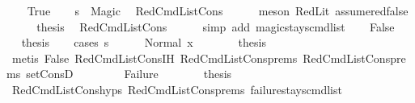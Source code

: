 \begin{isabellebody}
\ \ \isamarkupfalse%
\ True\isanewline
\ \ \isamarkupfalse%
\ {\isachardoublequoteopen}s{\isacharprime}{\kern0pt}{\isacharprime}{\kern0pt}\ {\isacharequal}{\kern0pt}\ Magic{\isachardoublequoteclose}\ \isamarkupfalse%
\ RedCmdListCons\isanewline
\ \ \ \ \isamarkupfalse%
\ {\isacharparenleft}{\kern0pt}meson\ RedLit\ assume{\isacharunderscore}{\kern0pt}red{\isacharunderscore}{\kern0pt}false{\isacharparenright}{\kern0pt}\isanewline
\ \ \isamarkupfalse%
\ \isamarkupfalse%
\ {\isacharquery}{\kern0pt}thesis\ \isamarkupfalse%
\ RedCmdListCons\isanewline
\ \ \ \ \isamarkupfalse%
\ {\isacharparenleft}{\kern0pt}simp\ add{\isacharcolon}{\kern0pt}\ magic{\isacharunderscore}{\kern0pt}stays{\isacharunderscore}{\kern0pt}cmd{\isacharunderscore}{\kern0pt}list{\isacharunderscore}{\kern0pt}{}{\isacharparenright}{\kern0pt}\isanewline
{}\isamarkupfalse%
\isanewline
\ \ \isamarkupfalse%
\ False\isanewline
\ \ \isamarkupfalse%
\ \isamarkupfalse%
\ {\isacharquery}{\kern0pt}thesis\isanewline
\ \ \isamarkupfalse%
\ {\isacharparenleft}{\kern0pt}cases\ {\isachardoublequoteopen}s{\isacharprime}{\kern0pt}{\isacharprime}{\kern0pt}{\isachardoublequoteclose}{\isacharparenright}{\kern0pt}\isanewline
\ \ \ \ \isamarkupfalse%
\ {\isacharparenleft}{\kern0pt}Normal\ x{}{\isacharparenright}{\kern0pt}\isanewline
\ \ \ \ \isamarkupfalse%
\ \isamarkupfalse%
\ {\isacharquery}{\kern0pt}thesis\isanewline
\ \ \ \ \ \ \isamarkupfalse%
\ {\isacharparenleft}{\kern0pt}metis\ False\ RedCmdListCons{\isachardot}{\kern0pt}IH\ RedCmdListCons{\isachardot}{\kern0pt}prems{\isacharparenleft}{\kern0pt}{}{\isacharparenright}{\kern0pt}\ RedCmdListCons{\isachardot}{\kern0pt}prems{\isacharparenleft}{\kern0pt}{}{\isacharparenright}{\kern0pt}\ set{\isacharunderscore}{\kern0pt}ConsD{\isacharparenright}{\kern0pt}\isanewline
\ \ \isamarkupfalse%
\isanewline
\ \ \ \ \isamarkupfalse%
\ Failure\isanewline
\ \ \ \ \isamarkupfalse%
\ \isamarkupfalse%
\ {\isacharquery}{\kern0pt}thesis\isanewline
\ \ \ \ \ \ \isamarkupfalse%
\ RedCmdListCons{\isachardot}{\kern0pt}hyps{\isacharparenleft}{\kern0pt}{}{\isacharparenright}{\kern0pt}\ RedCmdListCons{\isachardot}{\kern0pt}prems{\isacharparenleft}{\kern0pt}{}{\isacharparenright}{\kern0pt}\ failure{\isacharunderscore}{\kern0pt}stays{\isacharunderscore}{\kern0pt}cmd{\isacharunderscore}{\kern0pt}list\ \isamarkupfalse%

\end{isabellebody}
